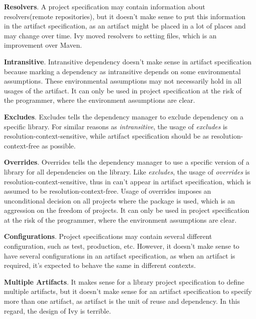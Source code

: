 \textbf{Resolvers}. A project specification may contain information about resolvers(remote repositories), but it doesn't make sense to put this information in the artifact specification, as an artifact might be placed in a lot of places and may change over time. Ivy moved resolvers to setting files, which is an improvement over Maven.


\textbf{Intransitive}. Intransitive dependency doesn't make sense in artifact specification because marking a dependency as intransitive depends on some environmental assumptions. These environmental assumptions may not necessarily hold in all usages of the artifact. It can only be used in project specification at the risk of the programmer, where the environment assumptions are clear.

\textbf{Excludes}. Excludes tells the dependency manager to exclude dependency on a specific library. For similar reasons as \emph{intransitive}, the usage of \emph{excludes} is resolution-context-sensitive, while artifact specification should be as resolution-context-free as possible.

\textbf{Overrides}. Overrides tells the dependency manager to use a specific version of a library for all dependencies on the library. Like \emph{excludes}, the usage of \emph{overrides} is resolution-context-sensitive, thus in can't appear in artifact specification, which is assumed to be resolution-context-free. Usage of overrides imposes an unconditional decision on all projects where the package is used, which is an aggression on the freedom of projects. It can only be used in project specification at the risk of the programmer, where the environment assumptions are clear.

\textbf{Configurations}. Project specifications may contain several different configuration, such as test, production, etc. However, it doesn't make sense to have several configurations in an artifact specification, as when an artifact is required, it's expected to behave the same in different contexts.

\textbf{Multiple Artifacts}. It makes sense for a library project specification to define multiple artifacts, but it doesn't make sense for an artifact specification to specify more than one artifact, as artifact is the unit of reuse and dependency. In this regard, the design of Ivy is terrible.

